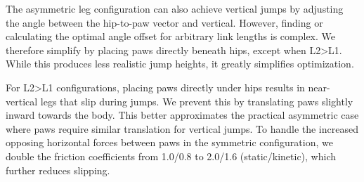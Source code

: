 The asymmetric leg configuration can also achieve vertical jumps by adjusting the angle between the hip-to-paw vector and vertical. However, finding or calculating the optimal angle offset for arbitrary link lengths is complex. We therefore simplify by placing paws directly beneath hips, except when L2>L1. While this produces less realistic jump heights, it greatly simplifies optimization.

For L2>L1 configurations, placing paws directly under hips results in near-vertical legs that slip during jumps. We prevent this by translating paws slightly inward towards the body. This better approximates the practical asymmetric case where paws require similar translation for vertical jumps. To handle the increased opposing horizontal forces between paws in the symmetric configuration, we double the friction coefficients from 1.0/0.8 to 2.0/1.6 (static/kinetic), which further reduces slipping.


